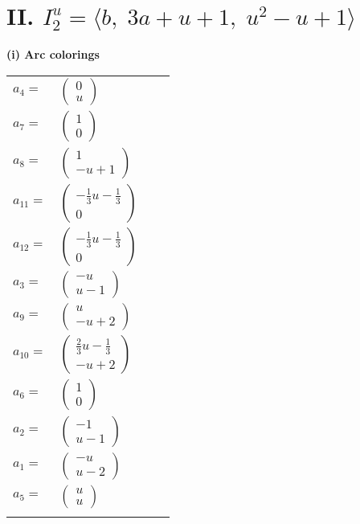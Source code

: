 \documentclass[1p]{elsarticle_modified}
\theoremstyle{definition}
\begin{document}
\centering \section*{II. $I^u_{2}= \langle b,\;3 a+u+1,\;u^2- u+1 \rangle$}
\flushleft \textbf{(i) Arc colorings}\\
\begin{tabular}{m{7pt} m{180pt} m{7pt} m{180pt} }
\flushright $a_{4}=$&$\begin{pmatrix}0\\u\end{pmatrix}$ \\
\flushright $a_{7}=$&$\begin{pmatrix}1\\0\end{pmatrix}$ \\
\flushright $a_{8}=$&$\begin{pmatrix}1\\- u+1\end{pmatrix}$ \\
\flushright $a_{11}=$&$\begin{pmatrix}-\frac{1}{3} u-\frac{1}{3}\\0\end{pmatrix}$ \\
\flushright $a_{12}=$&$\begin{pmatrix}-\frac{1}{3} u-\frac{1}{3}\\0\end{pmatrix}$ \\
\flushright $a_{3}=$&$\begin{pmatrix}- u\\u-1\end{pmatrix}$ \\
\flushright $a_{9}=$&$\begin{pmatrix}u\\- u+2\end{pmatrix}$ \\
\flushright $a_{10}=$&$\begin{pmatrix}\frac{2}{3} u-\frac{1}{3}\\- u+2\end{pmatrix}$ \\
\flushright $a_{6}=$&$\begin{pmatrix}1\\0\end{pmatrix}$ \\
\flushright $a_{2}=$&$\begin{pmatrix}-1\\u-1\end{pmatrix}$ \\
\flushright $a_{1}=$&$\begin{pmatrix}- u\\u-2\end{pmatrix}$ \\
\flushright $a_{5}=$&$\begin{pmatrix}u\\u\end{pmatrix}$\\&\end{tabular}
\end{document}

